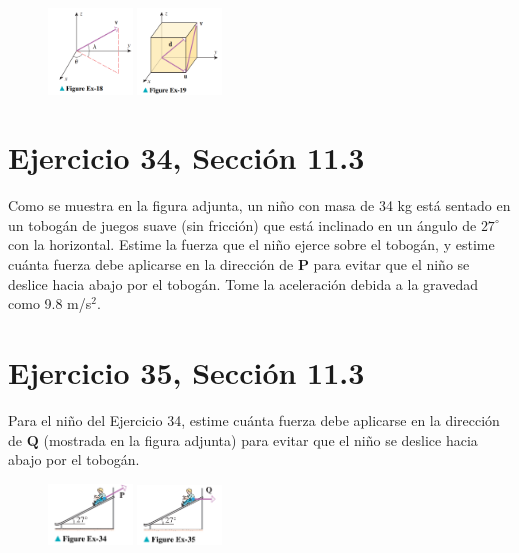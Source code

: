 \documentclass[11pt,letterpaper]{article}
\begin{document}
\begin{figure}[h]
    \centering
    \includegraphics[width=0.2\textwidth]{imagenes/Figure_Ex-18.png}
    \hspace{5cm}
    \includegraphics[width=0.2\textwidth]{imagenes/Figure_Ex-19.png}
\end{figure}


\section{Ejercicio 34, Sección 11.3}
Como se muestra en la figura adjunta, un niño con masa de 34 kg está sentado en un tobogán de juegos suave (sin fricción) que está inclinado en un ángulo de $27^\circ$ con la horizontal. Estime la fuerza que el niño ejerce sobre el tobogán, y estime cuánta fuerza debe aplicarse en la dirección de $\mathbf{P}$ para evitar que el niño se deslice hacia abajo por el tobogán. Tome la aceleración debida a la gravedad como 9.8 m/s$^2$.


\section{Ejercicio 35, Sección 11.3}
Para el niño del Ejercicio 34, estime cuánta fuerza debe aplicarse en la dirección de $\mathbf{Q}$ (mostrada en la figura adjunta) para evitar que el niño se deslice hacia abajo por el tobogán.

\begin{figure}[h]
    \centering
    \includegraphics[width=0.2\textwidth]{imagenes/Figure_Ex-34.png}
    \hspace{5cm}
    \includegraphics[width=0.2\textwidth]{imagenes/Figure_Ex-35.png}
\end{figure}
\end{document}
